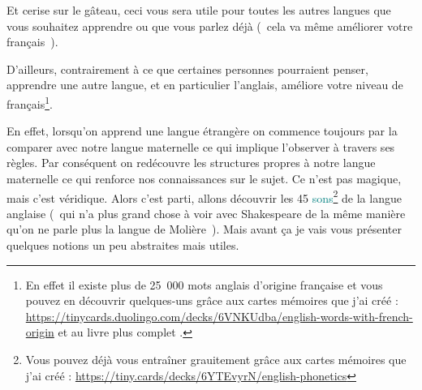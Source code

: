 Et cerise sur le gâteau, ceci vous sera utile pour toutes les autres
langues que vous souhaitez apprendre ou que vous parlez déjà (~cela va
même améliorer votre français~).

D'ailleurs, contrairement à ce que certaines personnes pourraient
penser, apprendre une autre langue, et en particulier l'anglais,
améliore votre niveau de français\footnote{En effet il existe plus de
  25~000 mots anglais d'origine française et vous pouvez en découvrir
  quelques-uns grâce aux cartes mémoires que j'ai créé :   \url{https://tinycards.duolingo.com/decks/6VNKUdba/english-words-with-french-origin}
  et au livre plus complet \HSQMYP.}.

En effet, lorsqu'on apprend une langue étrangère on commence toujours
par la comparer avec notre langue maternelle ce qui implique
l'observer à travers ses règles. Par conséquent on redécouvre les
structures propres à notre langue maternelle ce qui renforce nos
connaissances sur le sujet. Ce n'est pas magique, mais c'est
véridique. Alors c'est parti, allons découvrir les 45
\textcolor{teal}{sons}\footnote{Vous pouvez déjà vous entraîner
  grauitement grâce aux cartes mémoires que j'ai créé : \url{https://tiny.cards/decks/6YTEvyrN/english-phonetics}}
de la langue anglaise (~qui n'a plus grand chose à voir avec 
Shakespeare de la même manière qu'on ne parle plus la langue de
Molière~). Mais avant ça je vais vous présenter quelques notions un peu
abstraites mais utiles. 

\newpage
\minitoc
